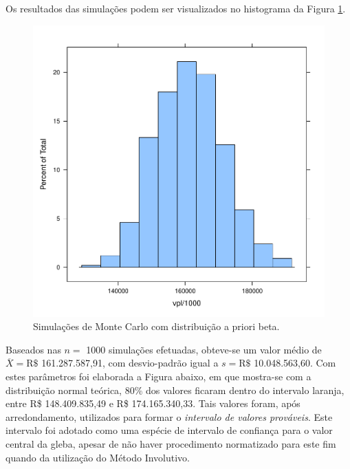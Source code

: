 \documentclass[
  10pt,
  a4paper]{article}
\begin{document}
Os resultados das simulações podem ser visualizados no histograma da
Figura \ref{fig:betaMC}.

\begin{figure}[H]

{\centering \includegraphics[width=0.7\linewidth]{images/betaMC-1} 

}

\caption{Simulações de Monte Carlo com distribuição a priori beta.}\label{fig:betaMC}
\end{figure}

Baseados nas \(n =\) 1000 simulações efetuadas, obteve-se um valor médio
de \(\overline{X} = \text{R\$ }\) 161.287.587,91, com desvio-padrão
igual a \(s = \text{R\$ }\) 10.048.563,60. Com estes parâmetros foi
elaborada a Figura abaixo, em que mostra-se com a distribuição normal
teórica, 80\% dos valores ficaram dentro do intervalo laranja, entre R\$
148.409.835,49 e R\$ 174.165.340,33. Tais valores foram, após
arredondamento, utilizados para formar o \emph{intervalo de valores
prováveis}. Este intervalo foi adotado como uma espécie de intervalo de
confiança para o valor central da gleba, apesar de não haver
procedimento normatizado para este fim quando da utilização do Método
Involutivo.
\end{document}
